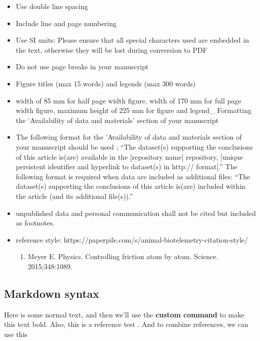 \documentclass[
  authoryear,
  review,
  3p]{elsarticle}
\providecommand{\tightlist}{%
  \setlength{\itemsep}{0pt}\setlength{\parskip}{0pt}}\usepackage{longtable,booktabs,array}
\newcommand{\mycommand}[1]{\textbf{#1}}
\begin{document}
\begin{itemize}
\tightlist
\item
  Use double line spacing
\item
  Include line and page numbering
\item
  Use SI units: Please ensure that all special characters used are
  embedded in the text, otherwise they will be lost during conversion to
  PDF
\item
  Do not use page breaks in your manuscript
\item
  Figure titles (max 15 words) and legends (max 300 words)
\item
  width of 85 mm for half page width figure, width of 170 mm for full
  page width figure, maximum height of 225 mm for figure and legend\_
  Formatting the `Availability of data and materials' section of your
  manuscript
\item
  The following format for the 'Availability of data and materials
  section of your manuscript should be used ; ``The dataset(s)
  supporting the conclusions of this article is(are) available in the
  {[}repository name{]} repository, {[}unique persistent identifier and
  hyperlink to dataset(s) in http:// format{]}.'' The following format
  is required when data are included as additional files: ``The
  dataset(s) supporting the conclusions of this article is(are) included
  within the article (and its additional file(s)).''
\item
  unpublished data and personal communication shall not be cited but
  included as footnotes.
\item
  reference style:
  https://paperpile.com/s/animal-biotelemetry-citation-style/

  \begin{enumerate}
  \def\labelenumi{\arabic{enumi}.}
  \tightlist
  \item
    Meyer E. Physics. Controlling friction atom by atom. Science.
    2015;348:1089.
  \end{enumerate}
\end{itemize}

\hypertarget{markdown-syntax}{%
\subsection*{Markdown syntax}\label{markdown-syntax}}

Here is some normal text, and then we'll use the
\mycommand{custom command} to make this text bold. Also, this is a
reference test \citet{dodge_2013}. And to combine references, we can use
this \citep{nathan_2008, dodge_2013}
\end{document}
